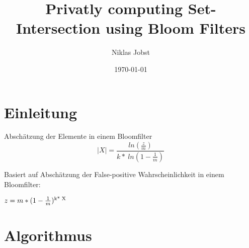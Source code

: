 \documentclass{beamer}
\title[Privatly computing Set-Intersection]{Privatly computing Set-Intersection using Bloom Filters}
\author{Niklas Jobst}
\institute{TCS - Universität zu Lübeck}
\date{\today}
\begin{document}
\section{Einleitung}
\begin{frame}{Abschätzung der Elemente in einem Bloomfilter}
	$$ |X| = \frac{ln( \frac{z}{m})}{k* \ ln(1- \frac{1}{m})}$$
	
	\begin{arrowlist}
		\item Basiert auf Abschätzung der False-positive Wahrscheinlichkeit in einem Bloomfilter:
		\item 	$ z = m*(1 -\frac{1}{m})\textsuperscript{k* X}$ 
	\end{arrowlist}

\end{frame}

\section{Algorithmus}
\end{document}
